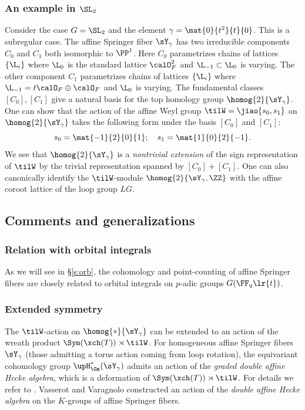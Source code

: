 \subsubsection{An example in $\SL_{2}$}\label{sss:tilW SL2 ram} Consider the case $G=\SL_{2}$ and the element $\gamma=\mat{0}{t^{2}}{t}{0}$. This is a subregular case. The affine Springer fiber $\sY_{\gamma}$ has two irreducible components $C_{0}$ and $C_{1}$ both isomorphic to $\PP^{1}$. Here $C_{0}$ parametrizes chains of lattices $\{\L_{i}\}$ where $\L_{0}$ is the standard lattice $\calO^{2}_{F}$ and $\L_{-1}\subset \L_{0}$ is varying. The other component $C_{1}$ parametrizes chains of lattices $\{\L_{i}\}$ where $\L_{-1}=t\calO_{F}\oplus\calO_{F}$ and $\L_{0}$ is varying. The fundamental classes $[C_{0}], [C_{1}]$ give a natural basis for the top homology group $\homog{2}{\sY_{\gamma}}$. One can show that the action of the affine Weyl group $\tilW=\jiao{s_{0},s_{1}}$ on $\homog{2}{\sY_{\gamma}}$ takes the following form under the basis $[C_{0}]$ and $[C_{1}]$:
\begin{equation*}
s_{0}=\mat{-1}{2}{0}{1}; \quad s_{1}=\mat{1}{0}{2}{-1}.
\end{equation*} 
We see that $\homog{2}{\sY_{\gamma}}$ is a {\em nontrivial extension} of the sign representation of $\tilW$ by the trivial representation spanned by $[C_{0}]+[C_{1}]$. One can also canonically identify the $\tilW$-module $\homog{2}{\sY_{\gamma},\ZZ}$ with the affine coroot lattice of the loop group $LG$.

\subsection{Comments and generalizations}

\subsubsection{Relation with orbital integrals} As we will see in \S\ref{s:orb}, the cohomology and point-counting of affine Springer fibers are closely related to orbital integrals on $p$-adic groups $G(\FF_{q}\lr{t})$. 

\subsubsection{Extended symmetry} The $\tilW$-action on $\homog{*}{\sY_{\gamma}}$ can be extended to an action of the wreath product $\Sym(\xch(T))\rtimes \tilW$. For homogeneous affine Springer fibers $\sY_{\gamma}$ (those admitting a torus action coming from loop rotation), the equivariant cohomology group $\upH^{*}_{\Gm}(\sY_{\gamma})$ admits an action of the {\em graded double affine Hecke algebra},  which is a deformation of $\Sym(\xch(T))\rtimes \tilW$. For details we refer to \cite{OY}. Vasserot and Varagnolo \cite{Vass} \cite{VV} constructed an action of the {\em double affine Hecke algebra} on the $K$-groups of affine Springer fibers.


